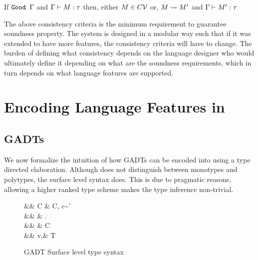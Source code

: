 \documentclass[manuscript,screen,nonacm]{acmart}
\begin{document}
\begin{theorem}\label{thm:progress-sfc}
 If $\texttt{Good }\Gamma$ and $\Gamma \vdash M : \tau$ then, either $M \in C\mathcal{V}$ or, $M \rightsquigarrow M'$ and
 $\Gamma \vdash M' : \tau$
\end{theorem}

The above consistency criteria is the minimum requirement to guarantee soundness property. The system is designed in a modular way such that if it was extended to have more features, the consistency criteria will have to change. The burden of defining what consistency depends on the language designer who would ultimately define it depending on what are the soundness requirements, which in turn depends on what language features are supported.

\section{Encoding Language Features in \SFC}
\subsection{GADTs}\label{sec:fc-encodes-gadts}
We now formalize the intuition of how GADTs can be encoded into \SFC using a type directed elaboration. Although \SFC does not distinguish between monotypes and polytypes, the surface level syntax does. This is due to pragmatic reasons, allowing a higher ranked type scheme makes the type inference non-trivial\cite{jones_practical_2007}.

\begin{figure}[ht]
 \centering
 \begin{syntax}
  && C \bnfeq& \empt \bnfor C, c\co\tau\sim\tau'\\
  && \pi \bnfeq& \eta \bnfor \Forall\TyVar.\pi\\
  && \eta \bnfeq& \tau \bnfor C \then \eta\\
  && v,\tau \bnfeq& \TyVar \bnfor \tau\to\tau \bnfor T\App\many\tau
 \end{syntax}
 \caption{GADT Surface level type syntax}
 \label{fig:gadt-type-syntax}
\end{figure}
\end{document}
